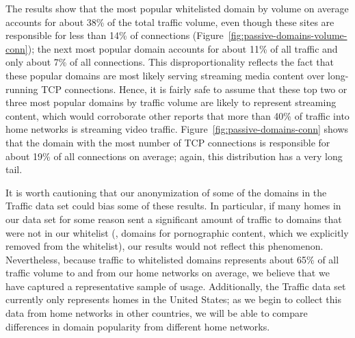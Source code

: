 The results show that the most popular whitelisted domain by volume on
average accounts for about 38\% of the total traffic volume, even though
these sites are responsible for less than 14\% of connections
(Figure~\ref{fig:passive-domains-volume-conn}); the next most popular
domain accounts for about 11\% of all traffic and only about 7\% of all
connections.  This disproportionality reflects the fact that these
popular domains are most likely serving streaming media content over
long-running TCP connections.  Hence, it is fairly safe to assume that
these top two or three most popular domains by traffic volume are likely
to represent streaming content, which would corroborate other reports
that more than 40\% of traffic into home networks is streaming video
traffic.  Figure~\ref{fig:passive-domains-conn} shows that the domain
with the most number of TCP connections is responsible for about 19\% of
all connections on average; again, this distribution has a very long tail.

It is worth cautioning that our anonymization of some of the domains in
the Traffic data set could bias some of these results.  In
particular, if many homes in our data set for some reason sent a
significant amount of traffic to domains that were not in our whitelist
(\eg, domains for pornographic content, which we explicitly removed from
the whitelist), our results would not reflect this phenomenon.
Nevertheless, because traffic to whitelisted domains represents about
65\% of all traffic volume to and from our home networks on average, we
believe that we have captured a representative sample of usage.
Additionally, the Traffic data set currently only represents homes
in the United States; as we begin to collect this data from home
networks in other countries, we will be able to compare differences in domain
popularity from different home networks.

